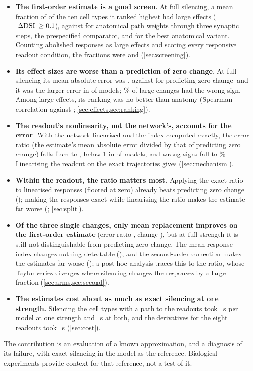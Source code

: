 \begin{itemize}
  \item \textbf{The first-order estimate is a good screen.} At full silencing, a mean fraction of \PrecFOFull{} of the ten cell types it ranked highest had large effects ($|\Delta\mathrm{DSI}|\ge0.1$), against \PrecAnatFull{} for anatomical path weights through three synaptic steps, the prespecified comparator, and \PrecAnatFourFull{} for the best anatomical variant. Counting abolished responses as large effects and scoring every responsive readout condition, the fractions were \InclFOFull{} and \InclAnatFull{} (\cref{sec:screening}).
  \item \textbf{Its effect sizes are worse than a prediction of zero change.} At full silencing its mean absolute error was \MaeFOFull{}, against \MaeZeroFull{} for predicting zero change, and it was the larger error in \MaeWorseFull{} of \NConfModels{} models; \WrongSignFull\% of large changes had the wrong sign. Among large effects, its ranking was no better than anatomy (Spearman correlation \RhoLargeFOFull{} against \RhoLargeAnatFull{}; \cref{sec:effects,sec:ranking}).
  \item \textbf{The readout's nonlinearity, not the network's, accounts for the error.} With the network linearised and the index computed exactly, the error ratio (the estimate's mean absolute error divided by that of predicting zero change) falls from \RatioRefFull{} to \RatioCfReadFull{} \RatioCICfReadFull{}, below 1 in \BelowOneCfRead{} of \NConfModels{} models, and wrong signs fall to \WrongCfReadFull\%. Linearising the readout on the exact trajectories gives \RatioCfNetFull{} (\cref{sec:mechanism}).
  \item \textbf{Within the readout, the ratio matters most.} Applying the exact ratio to linearised responses (floored at zero) already beats predicting zero change (\RatioSplitRatioFull{}); making the responses exact while linearising the ratio makes the estimate far worse (\RatioSplitRespFull{}; \cref{sec:split}).
  \item \textbf{Of the three single changes, only mean replacement improves on the first-order estimate} (error ratio \RatioAFull{}, change \ChangeAFull{} \ChangeCIAFull{}), but at full strength it is still not distinguishable from predicting zero change. The mean-response index changes nothing detectable (\RatioBFull{}), and the second-order correction makes the estimates far worse (\RatioCFull{}); a post hoc analysis traces this to the ratio, whose Taylor series diverges where silencing changes the responses by a large fraction (\cref{sec:arms,sec:second}).
  \item \textbf{The estimates cost about as much as exact silencing at one strength.} Silencing the \SimulatedTypes{} cell types with a path to the readouts took \TimeExactFull{}~s per model at one strength and \TimeExactBoth{}~s at both, and the derivatives for the eight readouts took \TimeGradient{}~s (\cref{sec:cost}).
\end{itemize}
The contribution is an evaluation of a known approximation, and a diagnosis of its failure, with exact silencing in the model as the reference. Biological experiments provide context for that reference, not a test of it.
